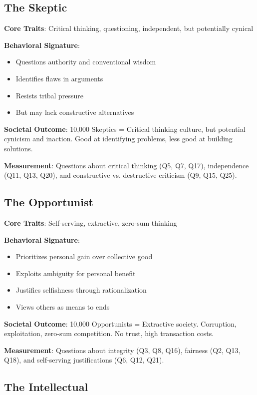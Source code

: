 \documentclass[11pt,a4paper]{article}
\begin{document}
\subsection{The Skeptic}

\textbf{Core Traits}: Critical thinking, questioning, independent, but potentially cynical

\textbf{Behavioral Signature}:
\begin{itemize}[leftmargin=*]
    \item Questions authority and conventional wisdom
    \item Identifies flaws in arguments
    \item Resists tribal pressure
    \item But may lack constructive alternatives
\end{itemize}

\textbf{Societal Outcome}: 10,000 Skeptics = Critical thinking culture, but potential cynicism and inaction. Good at identifying problems, less good at building solutions.

\textbf{Measurement}: Questions about critical thinking (Q5, Q7, Q17), independence (Q11, Q13, Q20), and constructive vs. destructive criticism (Q9, Q15, Q25).

\subsection{The Opportunist}

\textbf{Core Traits}: Self-serving, extractive, zero-sum thinking

\textbf{Behavioral Signature}:
\begin{itemize}[leftmargin=*]
    \item Prioritizes personal gain over collective good
    \item Exploits ambiguity for personal benefit
    \item Justifies selfishness through rationalization
    \item Views others as means to ends
\end{itemize}

\textbf{Societal Outcome}: 10,000 Opportunists = Extractive society. Corruption, exploitation, zero-sum competition. No trust, high transaction costs.

\textbf{Measurement}: Questions about integrity (Q3, Q8, Q16), fairness (Q2, Q13, Q18), and self-serving justifications (Q6, Q12, Q21).

\subsection{The Intellectual}
\end{document}
